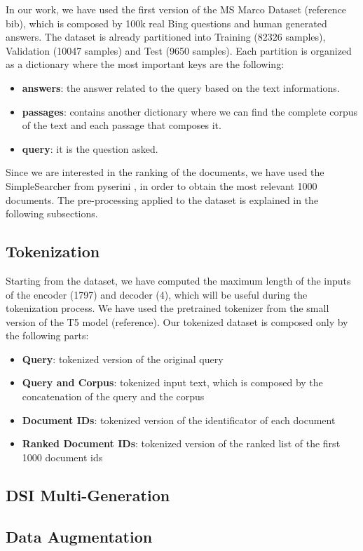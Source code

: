 In our work, we have used the first version of the MS Marco Dataset (reference bib), which is composed by 100k real Bing questions and human generated answers. The dataset is already partitioned into Training (82326 samples), Validation (10047 samples) and Test (9650 samples). Each partition is organized as a dictionary where the most important keys are the following:
\begin{itemize}
    \item \textbf{answers}: the answer related to the query based on the text informations.
    \item \textbf{passages}: contains another dictionary where we can find the complete corpus of the text and each passage that composes it.
    \item \textbf{query}: it is the question asked.
\end{itemize}
Since we are interested in the ranking of the documents, we have used the SimpleSearcher from pyserini \cite{pyserini}, in order to obtain the most relevant 1000 documents. 
The pre-processing applied to the dataset is explained in the following subsections.
\subsection{Tokenization}
Starting from the dataset, we have computed the maximum length of the inputs of the encoder (1797) and decoder (4), which will be useful during the tokenization process. We have used the pretrained tokenizer from the small version of the T5 model (reference). Our tokenized dataset is composed only by the following parts:
\begin{itemize}
    \item \textbf{Query}: tokenized version of the original query
    \item \textbf{Query and Corpus}: tokenized input text, which is composed by the concatenation of the query and the corpus
    \item \textbf{Document IDs}: tokenized version of the identificator of each document
    \item \textbf{Ranked Document IDs}: tokenized version of the ranked list of the first 1000 document ids
\end{itemize}
\subsection{DSI Multi-Generation}
\subsection{Data Augmentation}